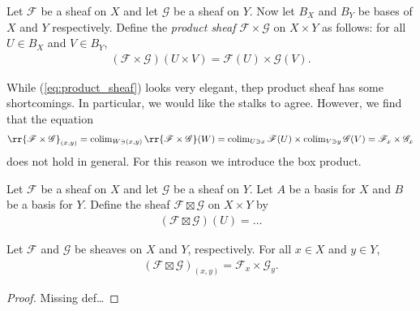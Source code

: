 \documentclass{article}
\begin{document}
\begin{definition}\label{def:product_sheaf}
  Let $\mathscr F$ be a sheaf on $X$ and let $\mathscr G$ be a sheaf
  on $Y$. Now let $B_X$ and $B_Y$ be bases of $X$ and $Y$ respectively.
  Define the \emph{product sheaf} $\mathscr F\times\mathscr G$
  on $X\times Y$ as follows: for all $U\in B_X$ and $V\in B_Y$,
  \begin{align}\label{eq:product_sheaf}
    (\mathscr F\times\mathscr G)(U\times V) = \mathscr F(U) \times \mathscr
    G(V).
  \end{align}
\end{definition}

While (\ref{eq:product_sheaf}) looks very elegant, thep product sheaf
has some shortcomings. In particular, we would like the stalks to agree.
However, we find that the equation
\begin{align*}
  \rr{\mathscr F\times\mathscr G}_{(x,y)}
  = \colim_{W\ni(x,y)}\rr{\mathscr F\times\mathscr G}(W)
  = \colim_{U\ni x}\mathscr F(U)\times\colim_{V\ni y}\mathscr G(V)
  = \mathscr F_x \times \mathscr G_x
\end{align*}
does not hold in general. For this reason we introduce the box product.

\begin{definition}
  Let $\mathscr F$ be a sheaf on $X$ and let $\mathscr G$ be a sheaf
  on $Y$. Let $A$ be a basis for $X$ and $B$ be a basis for $Y$.
  Define the sheaf $\mathscr F\boxtimes\mathscr G$ on $X\times Y$
  by
  \begin{align*}
    (\mathscr F\boxtimes\mathscr G)(U) = \ldots
  \end{align*}
\end{definition}

\begin{theorem}
  Let $\mathscr F$ and $\mathscr G$ be sheaves on $X$ and $Y$, respectively.
  For all $x\in X$ and $y\in Y$,
  \begin{align*}
    (\mathscr F\boxtimes\mathscr G)_{(x,y)}
    = \mathscr F_x \times \mathscr G_y.
  \end{align*}
  \begin{proof}
    Missing def\ldots
  \end{proof}
\end{theorem}

\printbibliography{}
\end{document}
